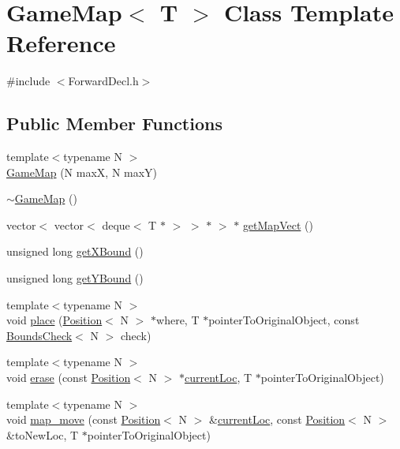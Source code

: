 \hypertarget{class_game_map}{\section{Game\-Map$<$ T $>$ Class Template Reference}
\label{class_game_map}
}


{\ttfamily \#include $<$Forward\-Decl.\-h$>$}

\subsection*{Public Member Functions}
\begin{DoxyCompactItemize}
\item 
{\footnotesize template$<$typename N $>$ }\\\hyperlink{class_game_map_aaf385841d0390f0b2b21fd6e2553c72e}{Game\-Map} (N max\-X, N max\-Y)
\item 
\hyperlink{class_game_map_a4bfac2bbaabb053fad5616666e222691}{$\sim$\-Game\-Map} ()
\item 
vector$<$ vector$<$ deque$<$ T $\ast$ $>$ $>$ $\ast$ $>$ $\ast$ \hyperlink{class_game_map_a47d97dc86ca0b91866b48dcaa9fa39a2}{get\-Map\-Vect} ()
\item 
unsigned long \hyperlink{class_game_map_abce7a6939365afdcab7bb29399a68ac1}{get\-X\-Bound} ()
\item 
unsigned long \hyperlink{class_game_map_a14de3740816e5328fcc2580363e51f18}{get\-Y\-Bound} ()
\item 
{\footnotesize template$<$typename N $>$ }\\void \hyperlink{class_game_map_aa38c0f97584d3b5b1b78389c94ad194f}{place} (\hyperlink{struct_position}{Position}$<$ N $>$ $\ast$where, T $\ast$pointer\-To\-Original\-Object, const \hyperlink{struct_bounds_check}{Bounds\-Check}$<$ N $>$ check)
\item 
{\footnotesize template$<$typename N $>$ }\\void \hyperlink{class_game_map_ad171ac0784575bfe68c9ad224fcf05ad}{erase} (const \hyperlink{struct_position}{Position}$<$ N $>$ $\ast$\hyperlink{class_game_map_ad9b90d1652b7db7d72370d10b361278d}{current\-Loc}, T $\ast$pointer\-To\-Original\-Object)
\item 
{\footnotesize template$<$typename N $>$ }\\void \hyperlink{class_game_map_a8aca03fd075ee28bbf65b917eb9a3449}{map\-\_\-move} (const \hyperlink{struct_position}{Position}$<$ N $>$ \&\hyperlink{class_game_map_ad9b90d1652b7db7d72370d10b361278d}{current\-Loc}, const \hyperlink{struct_position}{Position}$<$ N $>$ \&to\-New\-Loc, T $\ast$pointer\-To\-Original\-Object)

\end{DoxyCompactItemize}
